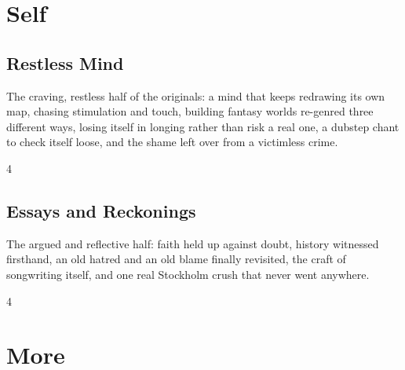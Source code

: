 \documentclass[a4paper,landscape]{memoir}
\begin{document}
\part{Self}

\chapter{Restless Mind}
The craving, restless half of the originals: a mind that keeps redrawing its own map, chasing stimulation and touch, building fantasy worlds re-genred three different ways, losing itself in longing rather than risk a real one, a dubstep chant to check itself loose, and the shame left over from a victimless crime.
\clearpage\begin{multicols*}{4}



















\end{multicols*}

\chapter{Essays and Reckonings}
The argued and reflective half: faith held up against doubt, history witnessed firsthand, an old hatred and an old blame finally revisited, the craft of songwriting itself, and one real Stockholm crush that never went anywhere.
\clearpage\begin{multicols*}{4}











\end{multicols*}

\part{More}
\end{document}

